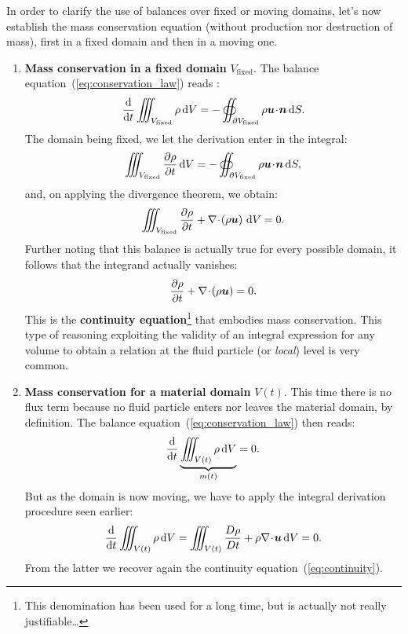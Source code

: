In order to clarify the use of balances over fixed or moving domains, let's now establish the mass conservation equation (without production nor destruction of mass), first in a fixed domain and then in a moving one.
\begin{enumerate}
\item \textbf{Mass conservation in a fixed domain} $V_\text{fixed}$. The balance equation~(\ref{eq:conservation_law}) reads :
\begin{equation}
\dd{}{t}\iiint_{V_\text{fixed}} \rho \, \dV = - \oiint_{\partial V_\text{fixed}} \rho \bu \!\cdot\! \bn \, \dS.
\end{equation}
The domain being fixed, we let the derivation enter in the integral:
\begin{equation}
\iiint_{V_\text{fixed}} \pd{\rho}{t} \, \dV = - \oiint_{\partial V_\text{fixed}} \rho \bu \!\cdot\! \bn \, \dS,
\end{equation}
and, on applying the divergence theorem, we obtain:
\begin{equation}
\iiint_{V_\text{fixed}} \pd{\rho}{t}  + \nabla \!\cdot\! \lp\rho \bu \rp \, \dV = 0.
\end{equation}
Further noting that this balance is actually true for every possible domain, it follows that the integrand actually vanishes:
\begin{equation}
\pd{\rho}{t}  + \nabla \!\cdot\! \lp\rho \bu \rp = 0.
\label{eq:continuity}
\end{equation}
This is the \textbf{continuity equation}\footnote{This denomination has been used for a long time, but is actually not really justifiable\dots} that embodies mass conservation. This type of reasoning exploiting the validity of an integral expression for any volume to obtain a relation at the fluid particle (or \textit{local}) level is very common.
\item \textbf{Mass conservation for a material domain} $V(t)$. This time there is no flux term because no fluid particle enters nor leaves the material domain, by definition. The balance equation~(\ref{eq:conservation_law}) then reads:
\begin{equation}
\frac{\mathrm d }{\mathrm d t}\underbrace{\iiint_{V(t)} \rho \, \mathrm dV}_{m(t)} = 0.
\end{equation}
But as the domain is now moving, we have to apply the integral derivation procedure seen earlier:
\begin{equation}
\dd{}{t} \iiint_{V(t)} \rho\, \dV = \iiint_{V(t)} \D{\rho}{t} + \rho \nabla \!\cdot\! \bu\,\dV = 0.
\end{equation}
From the latter we recover again the continuity equation~(\ref{eq:continuity}).
\end{enumerate}
